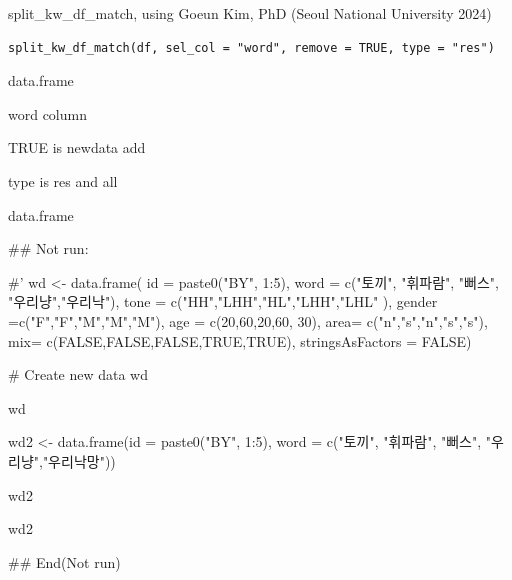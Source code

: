 \documentclass[a4paper]{book}
\begin{document}
%
\begin{Description}
split\_kw\_df\_match, using Goeun Kim, PhD (Seoul National University 2024)
\end{Description}
%
\begin{Usage}
\begin{verbatim}
split_kw_df_match(df, sel_col = "word", remove = TRUE, type = "res")
\end{verbatim}
\end{Usage}
%
\begin{Arguments}
\begin{ldescription}
\item[\code{df}] data.frame

\item[\code{sel\_col}] word column

\item[\code{remove}] TRUE is newdata add

\item[\code{type}] type is res and all
\end{ldescription}
\end{Arguments}
%
\begin{Value}
data.frame
\end{Value}
%
\begin{Examples}
\begin{ExampleCode}

## Not run: 

#' wd <- data.frame(
id =  paste0("BY", 1:5),
word = c("토끼", "휘파람", "뻐스", "우리냥","우리낙"),
tone = c("HH","LHH","HL","LHH","LHL" ),
gender =c("F","F","M","M","M"),
age = c(20,60,20,60, 30),
area= c("n","s","n","s","s"),
mix= c(FALSE,FALSE,FALSE,TRUE,TRUE),
stringsAsFactors = FALSE)

# Create new data
wd%

wd%

wd2 <- data.frame(id =  paste0("BY", 1:5),
word = c("토끼", "휘파람", "뻐스", "우리냥","우리낙망"))

wd2%

wd2%



## End(Not run)



\end{ExampleCode}
\end{Examples}
\end{document}
